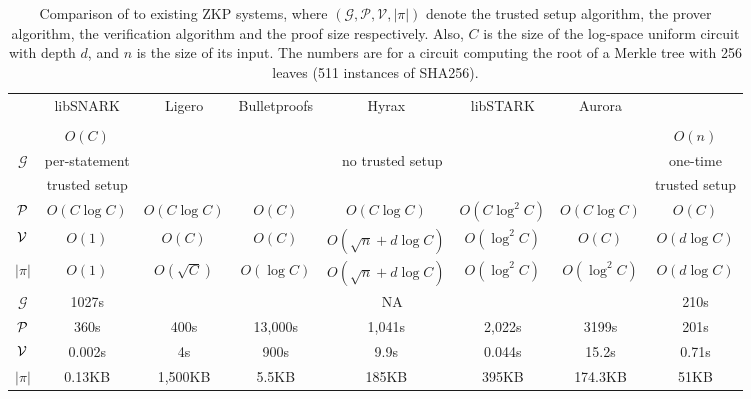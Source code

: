 \begin{table}[t]
\caption{\label{table:comp}Comparison of \name to existing ZKP systems, where $(\mathcal{G},\mathcal{P},\mathcal{V},|\pi|)$ denote the trusted setup algorithm, the prover algorithm, the verification algorithm and the proof size respectively. Also, $C$ is the size of the log-space uniform circuit with depth $d$, and $n$ is the size of its input. The numbers are for a circuit computing the root of a Merkle tree with 256 leaves (511 instances of SHA256).\protect\footnotemark}\label{tab:zkpall}
	\centering
	{\fontsize{9}{9}
	\begin{tabular}{|c|c|c|c|c|c|c|c|}
		
		\hline
		&\textsf{libSNARK}&\textsf{Ligero}&\textsf{Bulletproofs}&\textsf{Hyrax}&\textsf{libSTARK}&\textsf{Aurora}&\name\\
		&\cite{libsnark}&\cite{ligero}&\cite{bulletproofs}&\cite{hyrax}&\cite{libstark}&\cite{aurora}&\\
		\hline
		\hline
		&$O(C)$&\multicolumn{5}{c|}{}&$O(n)$\\
		$\mathcal{G}$&\textsf{per-statement}&\multicolumn{5}{c|}{\textsf{no trusted setup}}&\textsf{one-time}\\
		&\textsf{trusted setup}&\multicolumn{5}{c|}{}&\textsf{trusted setup}\\
		\hline
		$\P$&$O(C\log C)$&$O(C\log C)$&$O(C)$&$O(C\log C)$&$O(C\log^2 C)$&$O(C\log C)$ &$O(C)$\\
		\hline
		$\V$&$O(1)$&$O(C)$&$O(C)$&$O(\sqrt{n}+d\log C)$&$O(\log^2 C)$&$O(C)$&$O(d\log C)$\\
		\hline
		$|\pi|$&$O(1)$&$O(\sqrt{C})$&$O(\log C)$&$O(\sqrt{n}+d\log C)$&$O(\log^2 C)$& $O(\log^2 C)$&$O(d\log C)$\\
		\hline
		\hline
		$\mathcal{G}$&1027s&\multicolumn{5}{c|}{NA}&210s\\
		\hline
		$\P$&360s&400s&13,000s&1,041s&2,022s&3199s&201s\\
		\hline
			$\V$&0.002s&4s&900s&9.9s&0.044s&15.2s&0.71s\\
		\hline
		$|\pi|$&0.13KB&1,500KB&5.5KB&185KB&395KB&174.3KB&51KB\\
		\hline
	\end{tabular}
	
}
\end{table}

